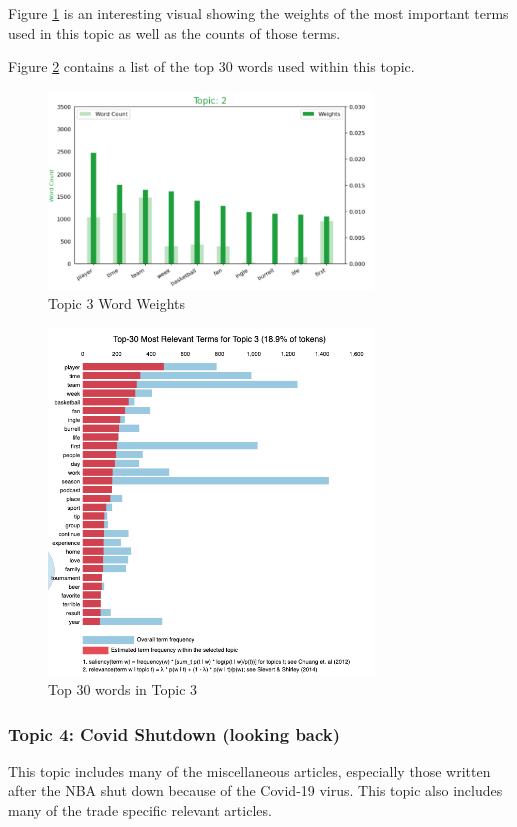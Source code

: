 \documentclass[5p,authoryear]{elsarticle}
\begin{document}
Figure \ref{weights3} is an interesting visual showing the weights of the most important terms used in this topic as well as the counts of those terms. 

Figure \ref{words3} contains a list of the top 30 words used within this topic.


\begin{figure}[!htb] \centering
	\includegraphics[width=3.4in]{figures/Topic2_words.png}
	\caption[]{Topic 3 Word Weights} 
	\label{weights3} 
\end{figure}

\begin{figure}[!htb] \centering
	\includegraphics[width=3.4in]{figures/top_topic3.png}
	\caption[]{Top 30 words in Topic 3} 
	\label{words3} 
\end{figure}



\subsubsection{Topic 4: Covid Shutdown (looking back)}

This topic includes many of the miscellaneous articles, especially those written after the NBA shut down because of the Covid-19 virus.
This topic also includes many of the trade specific relevant articles.
\end{document}

